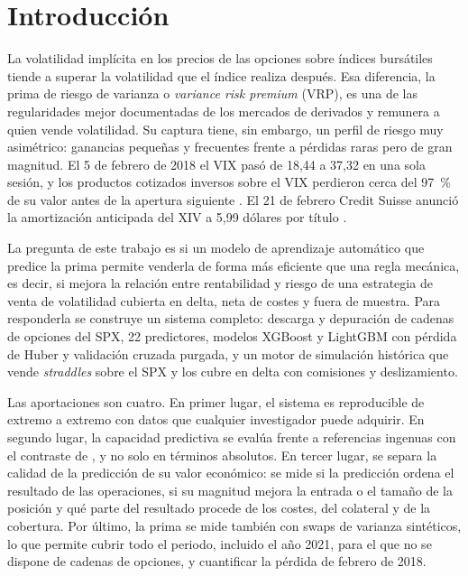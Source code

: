 \documentclass[11pt,a4paper]{article}
\begin{document}
\section{Introducción}\label{sec:intro}

La volatilidad implícita en los precios de las opciones sobre índices bursátiles tiende a superar la volatilidad que el índice realiza después. Esa diferencia, la prima de riesgo de varianza o \textit{variance risk premium} (VRP), es una de las regularidades mejor documentadas de los mercados de derivados \citep{carrwu2009} y remunera a quien vende volatilidad. Su captura tiene, sin embargo, un perfil de riesgo muy asimétrico: ganancias pequeñas y frecuentes frente a pérdidas raras pero de gran magnitud. El 5 de febrero de 2018 el VIX pasó de 18,44 a 37,32 en una sola sesión, y los productos cotizados inversos sobre el VIX perdieron cerca del 97~\% de su valor antes de la apertura siguiente \citep{augustin2021}. El 21 de febrero Credit Suisse anunció la amortización anticipada del XIV a 5,99 dólares por título \citep{varadarajan2023}.

La pregunta de este trabajo es si un modelo de aprendizaje automático que predice la prima permite venderla de forma más eficiente que una regla mecánica, es decir, si mejora la relación entre rentabilidad y riesgo de una estrategia de venta de volatilidad cubierta en delta, neta de costes y fuera de muestra. Para responderla se construye un sistema completo: descarga y depuración de cadenas de opciones del SPX, 22 predictores, modelos XGBoost y LightGBM con pérdida de Huber y validación cruzada purgada, y un motor de simulación histórica que vende \textit{straddles} sobre el SPX y los cubre en delta con comisiones y deslizamiento.

Las aportaciones son cuatro. En primer lugar, el sistema es reproducible de extremo a extremo con datos que cualquier investigador puede adquirir. En segundo lugar, la capacidad predictiva se evalúa frente a referencias ingenuas con el contraste de \citet{dieboldmariano1995}, y no solo en términos absolutos. En tercer lugar, se separa la calidad de la predicción de su valor económico: se mide si la predicción ordena el resultado de las operaciones, si su magnitud mejora la entrada o el tamaño de la posición y qué parte del resultado procede de los costes, del colateral y de la cobertura. Por último, la prima se mide también con swaps de varianza sintéticos, lo que permite cubrir todo el periodo, incluido el año 2021, para el que no se dispone de cadenas de opciones, y cuantificar la pérdida de febrero de 2018.
\end{document}

